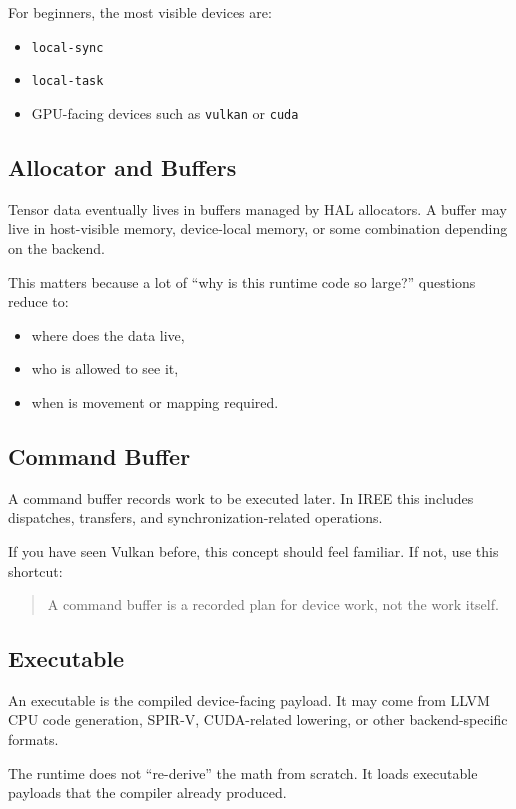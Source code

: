 \documentclass[11pt,a4paper]{article}
\begin{document}
For beginners, the most visible devices are:
\begin{itemize}
    \item \texttt{local-sync}
    \item \texttt{local-task}
    \item GPU-facing devices such as \texttt{vulkan} or \texttt{cuda}
\end{itemize}

\subsection{Allocator and Buffers}

Tensor data eventually lives in buffers managed by HAL allocators. A buffer may live in host-visible memory, device-local memory, or some combination depending on the backend.

This matters because a lot of ``why is this runtime code so large?'' questions reduce to:
\begin{itemize}
    \item where does the data live,
    \item who is allowed to see it,
    \item when is movement or mapping required.
\end{itemize}

\subsection{Command Buffer}

A command buffer records work to be executed later. In IREE this includes dispatches, transfers, and synchronization-related operations.

If you have seen Vulkan before, this concept should feel familiar. If not, use this shortcut:

\begin{quote}
A command buffer is a recorded plan for device work, not the work itself.
\end{quote}

\subsection{Executable}

An executable is the compiled device-facing payload. It may come from LLVM CPU code generation, SPIR-V, CUDA-related lowering, or other backend-specific formats.

The runtime does not ``re-derive'' the math from scratch. It loads executable payloads that the compiler already produced.
\end{document}
